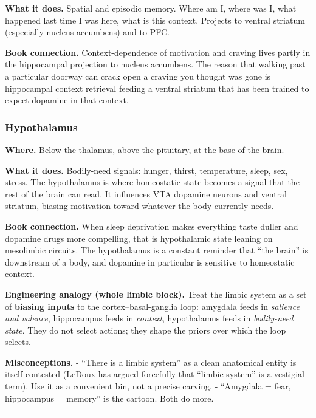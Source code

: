 \textbf{What it does.} Spatial and episodic memory. Where am I, where was I, what happened last time I was here, what is this context. Projects to ventral striatum (especially nucleus accumbens) and to PFC.

\textbf{Book connection.} Context-dependence of motivation and craving lives partly in the hippocampal projection to nucleus accumbens. The reason that walking past a particular doorway can crack open a craving you thought was gone is hippocampal context retrieval feeding a ventral striatum that has been trained to expect dopamine in that context.

\subsubsection{Hypothalamus}\label{06_neurology_101-hypothalamus}

\textbf{Where.} Below the thalamus, above the pituitary, at the base of the brain.

\textbf{What it does.} Bodily-need signals: hunger, thirst, temperature, sleep, sex, stress. The hypothalamus is where homeostatic state becomes a signal that the rest of the brain can read. It influences VTA dopamine neurons and ventral striatum, biasing motivation toward whatever the body currently needs.

\textbf{Book connection.} When sleep deprivation makes everything taste duller and dopamine drugs more compelling, that is hypothalamic state leaning on mesolimbic circuits. The hypothalamus is a constant reminder that ``the brain'' is downstream of a body, and dopamine in particular is sensitive to homeostatic context.

\textbf{Engineering analogy (whole limbic block).} Treat the limbic system as a set of \textbf{biasing inputs} to the cortex--basal-ganglia loop: amygdala feeds in \emph{salience and valence}, hippocampus feeds in \emph{context}, hypothalamus feeds in \emph{bodily-need state}. They do not select actions; they shape the priors over which the loop selects.

\textbf{Misconceptions.} - ``There is a limbic system'' as a clean anatomical entity is itself contested (LeDoux has argued forcefully that ``limbic system'' is a vestigial term). Use it as a convenient bin, not a precise carving. - ``Amygdala = fear, hippocampus = memory'' is the cartoon. Both do more.

\begin{center}\rule{0.5\linewidth}{0.5pt}\end{center}

